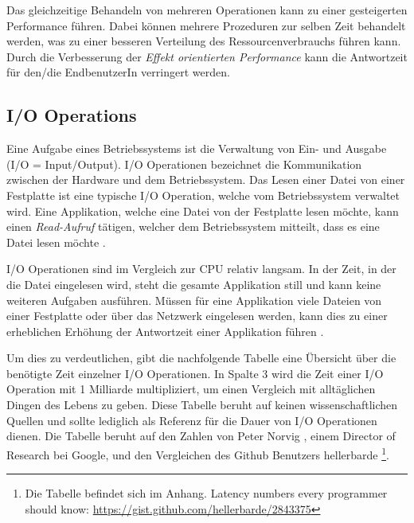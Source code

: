 Das gleichzeitige Behandeln von mehreren Operationen kann zu einer gesteigerten Performance führen. Dabei können mehrere Prozeduren zur selben Zeit behandelt werden, was zu einer besseren Verteilung des Ressourcenverbrauchs führen kann. Durch die Verbesserung der \emph{Effekt orientierten Performance} kann die Antwortzeit für den/die EndbenutzerIn verringert werden.

\subsection{I/O Operations}
\label{subsection: io_operationen}

Eine Aufgabe eines Betriebssystems ist die Verwaltung von Ein- und Ausgabe (I/O = Input/Output). I/O Operationen bezeichnet die Kommunikation zwischen der Hardware und dem Betriebssystem. Das Lesen einer Datei von einer Festplatte ist eine typische I/O Operation, welche vom Betriebssystem verwaltet wird. Eine Applikation, welche eine Datei von der Festplatte lesen möchte, kann einen \emph{Read-Aufruf} tätigen, welcher dem Betriebssystem mitteilt, dass es eine Datei lesen möchte \cite[p. 292]{tan09}.

I/O Operationen sind im Vergleich zur CPU relativ langsam. In der Zeit, in der die Datei eingelesen wird, steht die gesamte Applikation still und kann keine weiteren Aufgaben ausführen. Müssen für eine Applikation viele Dateien von einer Festplatte oder über das Netzwerk eingelesen werden, kann dies zu einer erheblichen Erhöhung der Antwortzeit einer Applikation führen \cite[p. 307]{tan09}. 

Um dies zu verdeutlichen, gibt die nachfolgende Tabelle eine Übersicht über die benötigte Zeit einzelner I/O Operationen. In Spalte 3 wird die Zeit einer I/O Operation mit 1 Milliarde multipliziert, um einen Vergleich mit alltäglichen Dingen des Lebens zu geben. Diese Tabelle beruht auf keinen wissenschaftlichen Quellen und sollte lediglich als Referenz für die Dauer von I/O Operationen dienen. Die Tabelle beruht auf den Zahlen von Peter Norvig \cite[]{Nor98}, einem Director of Research bei Google, und den Vergleichen des Github Benutzers hellerbarde \footnote{Die Tabelle befindet sich im Anhang. Latency numbers every programmer should know: \url{https://gist.github.com/hellerbarde/2843375}}.